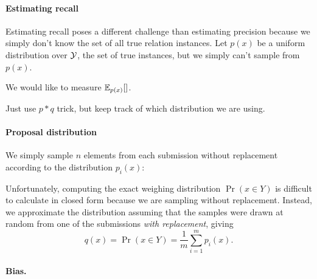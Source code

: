 \paragraph{Estimating recall}

Estimating recall poses a different challenge than estimating precision because we simply don't know the set of all true relation instances.
Let $p(x)$ be a uniform distribution over $\mathcal{Y}$, the set of true instances, but we simply can't sample from $p(x)$.

We would like to measure $\mathbb{E}_{p(x)}[]$.




Just use $p*q$ trick, but keep track of which distribution we are using.

\paragraph{Proposal distribution}
We simply sample $n$ elements from each submission without replacement according to the distribution $p_i(x)$:
\begin{algorithm}
\begin{algorithmic}
\ENDFOR{}
\end{algorithmic}
\end{algorithm}

Unfortunately, computing the exact weighing distribution $\Pr(x \in Y)$ is difficult to calculate in closed form because we are sampling without replacement.
Instead, we approximate the distribution assuming that the samples were drawn at random from one of the submissions \textit{with replacement}, giving 
\[
q(x) = \Pr(x \in Y) = \frac{1}{m}{\sum_{i=1}^m p_i(x)}.
\]

\paragraph{Bias.}

